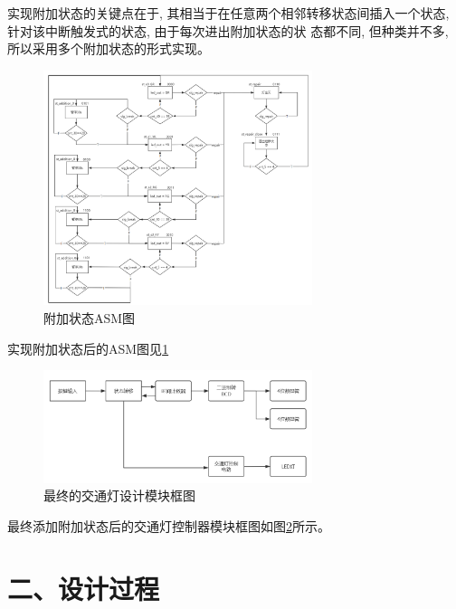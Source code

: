 \documentclass{article}
\newcommand{\fourhao}{\fontsize{14pt}{\baselineskip}\selectfont} %
\newcommand{\xiaosihao}{\fontsize{12pt}{\baselineskip}\selectfont} %
\begin{document}
实现附加状态的关键点在于, 其相当于在任意两个相邻转移状态间插入一个状态, 针对该中断触发式的状态, 由于每次进出附加状态的状
态都不同, 但种类并不多, 所以采用多个附加状态的形式实现。\\
\begin{figure}[htbp]
    \centering
    \includegraphics[width=0.7\textwidth]{image/2024-06-19-18-06-00.png}
    \caption{附加状态ASM图}
    \label{image_asm_3}
\end{figure}
实现附加状态后的ASM图见\ref{image_asm_3}\\
\begin{figure}[htbp]
    \centering
    \includegraphics[width=0.7\textwidth]{image/2024-06-28-17-21-13.png}
    \caption{最终的交通灯设计模块框图}
    \label{image_principle_1}
\end{figure}
最终添加附加状态后的交通灯控制器模块框图如图\ref{image_principle_1}所示。
\section*{\fourhao 二、设计过程}
\xiaosihao
{}
\end{document}
